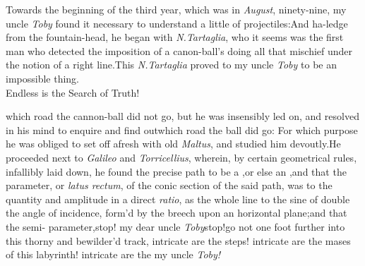 \documentclass{article}
\begin{document}
Towards the beginning of the third year, which was in
\textit{August}, ninety-nine, my uncle \textit{Toby} found it necessary
to understand a little of projectiles:\tsk And ha-\break{}\break ledge from the fountain-head, he began with
\textit{N.\@ Tartaglia}, who it seems was the first man who detected
the imposition of a canon-ball’s doing all that mischief
under the notion of a right line.\tsk This\break
\textit{N.\@ Tartaglia} proved to my uncle \textit{Toby} to be an
impossible thing.\\
\newpage
\tsh Endless is the Search of Truth!

\noindent
{}
which road the
cannon-ball did not go, but he was insensibly led on, and resolv\-ed
in his mind to enquire and find out\break which road the ball did go: For
which purpose he was obliged to set off afresh with old
\textit{Maltus}, and studied him devout\-ly.\tsk He proceeded next to
\textit{Galileo} and \textit{Torricellius}, wherein, by certain
geometrical rules, infallibly laid down, he found the precise path
to be a ,\tsk or else an
,\tsk and that the parameter, or \textit{latus
rectum}, of the conic section of the said path, was to the
quantity and amplitude in a direct \textit{ratio}, as the whole line
to the sine of double the angle of incidence, form’d by the breech
upon an horizontal plane;\tsk and that the
semi- parameter,\tsh stop! my dear uncle
\textit{Toby}\tsh stop!\tsk go not one foot further\break 
into this thorny and bewilder’d track,\tsk\break
intricate are the steps!  intricate are the\break
mases of this labyrinth! intricate are the\break
{}
my uncle \textit{Toby!}

\newpage
\end{document}
